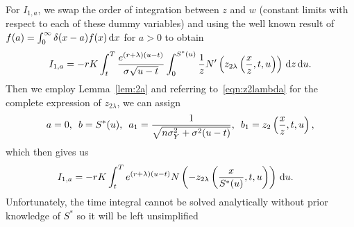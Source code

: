		For $I_{1,a}$, we swap the order of integration between $z$ and $w$ (constant limits with respect to each of these dummy variables) and using the well known result of $f(a) = \int_0^\infty \delta(x-a) f(x) \, \mathrm d x$ for $a > 0$ to obtain
        		$$
        			I_{1,a} = -rK\int_t^T \frac{e^{(r+\lambda)(u-t)}}{\sigma\sqrt{u-t}}\int_0^{S^*(u)} \frac{1}{z} N'\left( z_{2\lambda}\left( \frac{x}{z}, t, u \right) \right) \, \mathrm d z \, \mathrm d u.
        		$$
		Then we employ Lemma~\ref{lem:2a} and referring to~\eqref{eqn:z2lambda} for the complete expression of $z_{2\lambda}$, we can assign
			$$
				a = 0, \enskip b = S^*(u), \enskip a_1 = \frac{1}{\sqrt{n\sigma_Y^2 + \sigma^2(u-t)}}, \enskip
			b_1 = z_2\left( \frac{x}{z}, t, u \right),
			$$
		which then gives us
			\begin{align*}
				I_{1,a} &=  -rK\int_t^T e^{(r+\lambda)(u-t)}N\left(-z_{2\lambda}\left( \frac{x}{S^*(u)},t,u\right) \right) \, \mathrm d u.
			\end{align*}
			Unfortunately, the time integral cannot be solved analytically without prior knowledge of $S^*$ so it will be left unsimplified
		
